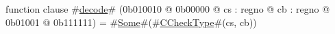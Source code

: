function clause #\hyperref[zdecode]{decode}# (0b010010 @ 0b00000 @ cs : regno @ cb : regno @    0b01001 @ 0b111111) = #\hyperref[zSome]{Some}#(#\hyperref[zCCheckType]{CCheckType}#(cs, cb))
